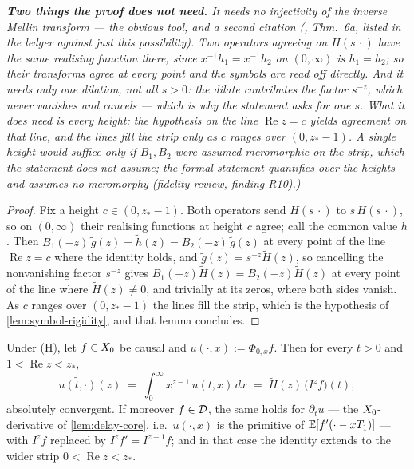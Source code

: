 \begin{lemma}
\emph{\textbf{Two things the proof does not need.} It needs no injectivity of the inverse Mellin
transform --- the obvious tool, and a second citation (, Thm.~6a, listed
in the ledger against just this possibility). Two operators agreeing on $H(s\,\cdot)$ have the
\emph{same} realising function there, since $x^{-1}h_1 = x^{-1}h_2$ on $(0,\infty)$ is $h_1 = h_2$;
so their transforms agree at every point and the symbols are read off directly. And it needs only
\emph{one} dilation, not all $s > 0$: the dilate contributes the factor $s^{-z}$, which never
vanishes and cancels --- which is why the statement asks for one $s$. What it does need is
\emph{every height}: the hypothesis on the line $\operatorname{Re} z = c$ yields agreement on that
line, and the lines fill the strip only as $c$ ranges over $(0, z_* - 1)$. A single height would
suffice only if $B_1, B_2$ were assumed meromorphic on the strip, which the statement does not
assume; the formal statement quantifies over the heights and assumes no meromorphy (fidelity
review, finding R10).)}
\end{lemma}

\begin{proof}
\leanok
{}
Fix a height $c \in (0, z_* - 1)$. Both operators send $H(s\,\cdot)$ to $s\,H(s\,\cdot)$, so on
$(0,\infty)$ their realising functions at height $c$ agree; call the common value $h$. Then
$B_1(-z)\,\tilde g(z) = \tilde h(z) = B_2(-z)\,\tilde g(z)$ at every point of the line
$\operatorname{Re} z = c$ where the identity holds, and $\tilde g(z) = s^{-z}\tilde H(z)$, so
cancelling the nonvanishing factor $s^{-z}$ gives $B_1(-z)\tilde H(z) = B_2(-z)\tilde H(z)$ at
every point of the line where $\tilde H(z) \ne 0$, and trivially at its zeros, where both sides
vanish. As $c$ ranges over $(0, z_* - 1)$ the lines fill the strip, which is the hypothesis of
\ref{lem:symbol-rigidity}, and that lemma concludes.
\end{proof}

\begin{lemma}\label{lem:memory-fractional-integrals}
\leanok
Under (H), let $f \in X_0$ be causal and $u(\cdot, x) := \Phi_{0,x} f$. Then for every $t > 0$
and $1 < \operatorname{Re} z < z_*$,
\[
  \widetilde{u(t, \cdot)}(z) \;=\; \int_0^\infty x^{z-1}\, u(t, x)\,dx
  \;=\; \tilde H(z)\,\bigl(I^{z} f\bigr)(t),
\]
absolutely convergent. If moreover $f \in \mathcal{D}$, the same holds for $\partial_t u$ --- the
$X_0$-derivative of \ref{lem:delay-core}, i.e.\ $u(\cdot, x)$ is the primitive of
$\mathbb{E}[f'(\cdot - xT_1)]$ --- with
$I^z f$ replaced by $I^z f' = I^{z-1} f$; and in that case the identity extends to the wider strip
$0 < \operatorname{Re} z < z_*$.
\statusT
\end{lemma}

